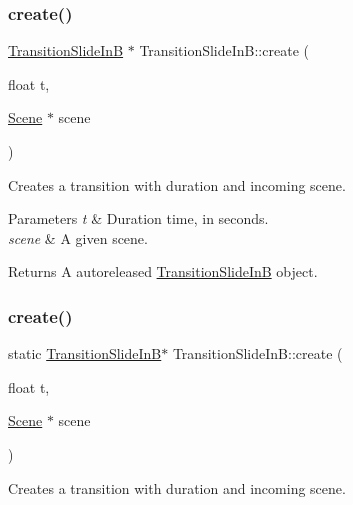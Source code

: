 \subsubsection{\texorpdfstring{create()}{create()}\hspace{0.1cm}{\footnotesize\ttfamily [1/2]}}
{\footnotesize\ttfamily \hyperlink{classTransitionSlideInB}{Transition\+Slide\+InB} $\ast$ Transition\+Slide\+In\+B\+::create (\begin{DoxyParamCaption}\item[{float}]{t,  }\item[{\hyperlink{classScene}{Scene} $\ast$}]{scene }\end{DoxyParamCaption})\hspace{0.3cm}{\ttfamily [static]}}

Creates a transition with duration and incoming scene.


\begin{DoxyParams}{Parameters}
{\em t} & Duration time, in seconds. \\
\hline
{\em scene} & A given scene. \\
\hline
\end{DoxyParams}
\begin{DoxyReturn}{Returns}
A autoreleased \hyperlink{classTransitionSlideInB}{Transition\+Slide\+InB} object. 
\end{DoxyReturn}
\mbox{\label{classTransitionSlideInB_a85fe3fe46d29809ef13f9705ce72f9d1}} 
\subsubsection{\texorpdfstring{create()}{create()}\hspace{0.1cm}{\footnotesize\ttfamily [2/2]}}
{\footnotesize\ttfamily static \hyperlink{classTransitionSlideInB}{Transition\+Slide\+InB}$\ast$ Transition\+Slide\+In\+B\+::create (\begin{DoxyParamCaption}\item[{float}]{t,  }\item[{\hyperlink{classScene}{Scene} $\ast$}]{scene }\end{DoxyParamCaption})\hspace{0.3cm}{\ttfamily [static]}}

Creates a transition with duration and incoming scene.


